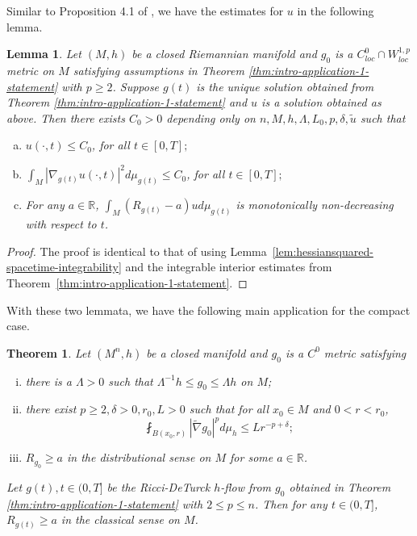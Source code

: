 \documentclass[12pt]{amsart}
\theoremstyle{plain}
\newtheorem{theorem}[subsection]{Theorem}
\theoremstyle{plain}
\newtheorem{lemma}[subsection]{Lemma}
\theoremstyle{definition}
\theoremstyle{remark}
\numberwithin{equation}{subsection}
\newcommand{\del}{\nabla}
\newcommand{\hdel}{\tilde{\nabla}}
\begin{document}
Similar to Proposition 4.1 of \cite{jiang_weak_2021}, we have the estimates for $u$ in the following lemma.
\begin{lemma}\label{lem:conjugate-heat-equation-estimates}
    Let $(M,h)$ be a closed Riemannian manifold and $g_0$ is a $C^0_{loc}\cap W^{1,p}_{loc}$ metric on $M$ satisfying assumptions in Theorem \ref{thm:intro-application-1-statement} with $p\geq 2$. Suppose $g(t)$ is the unique solution obtained from Theorem \ref{thm:intro-application-1-statement} and $u$ is a solution obtained as above. Then there exists $C_0>0$ depending only on $n,M,h,\Lambda,L_0,p,\delta,\tilde u$ such that
    \begin{enumerate}[(a)]
        \item $u(\cdot,t) \leq C_0$, for all $t \in [0,T];$
        \item $\displaystyle\int_M |\del_{g(t)} u(\cdot,t)|^2 d\mu_{g(t)} \leq C_0$, for all $t \in [0,T];$
        \item For any $a\in \mathbb{R}$, $\displaystyle\int_M (R_{g(t)} - a)u d\mu_{g(t)}$ is monotonically non-decreasing with respect to $t$.
    \end{enumerate}
\end{lemma}
\begin{proof}
The proof is identical to that of \cite[Proposition 4.1]{jiang_weak_2021} using Lemma~\ref{lem:hessiansquared-spacetime-integrability} and the integrable interior estimates from Theorem~\ref{thm:intro-application-1-statement}.
\end{proof}

With these two lemmata, we have the following main application for the compact case. 

\begin{theorem}\label{thm:preservation-distributional-scalar-curvature-lower-bound}
    Let $(M^n,h)$ be a  closed manifold and $g_0$ is a $C^0$ metric satisfying
    \begin{enumerate}[(i)]
        \item there is a $\Lambda > 0$ such that $\Lambda^{-1}h \leq g_0 \leq \Lambda h$ on $M$;
        \item there exist $p \geq 2, \delta > 0, r_0 ,L> 0$ such that for all $x_0 \in M$ and $0 < r < r_0$,
        \begin{equation}
            \fint_{B(x_0, r)} |\hdel g_0|^p d\mu_h \leq L r^{-p + \delta};
        \end{equation}
   \item $R_{g_0}\geq a$ in the distributional sense on $M$ for some $a\in \mathbb{R}$.
    \end{enumerate}
    Let $g(t), t \in (0, T]$ be the Ricci-DeTurck $h$-flow from $g_0$ obtained in Theorem \ref{thm:intro-application-1-statement} with $2 \leq p \leq n$. Then for any $t \in (0, T]$, $R_{g(t)} \geq a$ in the classical sense on $M$.
\end{theorem}
\end{document}

